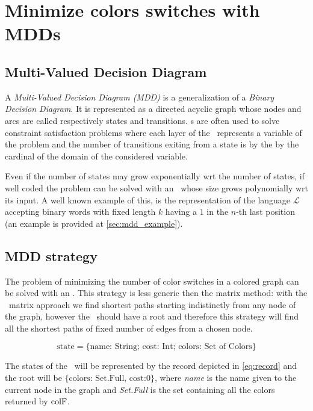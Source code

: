 \section{Minimize colors switches with MDDs}

\subsection{Multi-Valued Decision Diagram}

A \textit{Multi-Valued Decision Diagram (MDD)}\cite{regin} is a generalization of a \textit{Binary Decision Diagram}. It is represented as a directed acyclic graph whose nodes and arcs are called respectively states and transitions. \mdd s are often used to solve constraint satisfaction problems where each layer of the \mdd\ represents a variable of the problem and the number of transitions exiting from a state is  by the  by the cardinal of the domain of the considered variable.

Even if the number of states may grow exponentially wrt the number of states, if well coded the problem can be solved with an \mdd\ whose size grows polynomially wrt its input. A well known example of this, is the representation of the language $\mathcal{L}$ accepting binary words with fixed length $k$ having a $1$ in the $n$-th last position (an example is provided at \cref{sec:mdd_example}).

\subsection{MDD strategy}
\label{sec:algo_mdd}
The problem of minimizing the number of color switches in a colored graph can be solved with an \mdd. This strategy is less generic then the matrix method: with the \FW\ matrix approach we find shortest paths starting indistinctly from any node of the graph, however the \mdd\ should have a root and therefore this strategy will find all the shortest paths of fixed number of edges from a chosen node.

\begin{equation}
  \label{eq:record}
  \text{state} = \{\text{name: String; cost: Int; colors: Set of Colors}\}
\end{equation}

The states of the \mdd\ will be represented by the record depicted in \cref{eq:record} and the root will be $\{\text{colors: Set.Full, cost:} 0\}$, where \textit{name} is the name given to the current node in the graph and \textit{Set.Full} is the set containing all the colors returned by $\text{colF}$.

